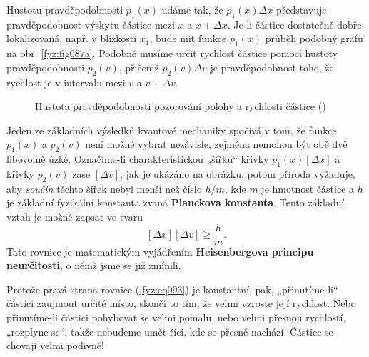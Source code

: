     Hustotu pravděpodobnosti \(p_1(x)\) udáme tak, že \(p_1(x)\Delta x\) představuje 
    pravděpodobnost výskytu částice mezi \(x\) a \(x+ \Delta x\). Je-li částice dostatečně dobře 
    lokalizovaná, např. v blízkosti \(x_1\), bude mít funkce \(p_1(x)\) průběh podobný grafu na 
    obr. \ref{fyz:fig087a}. Podobně musíme určit rychlost částice pomocí hustoty pravděpodobnosti 
    \(p_2(v)\), přičemž \(p_2(v)\Delta v\) je pravděpodobnost toho, že rychlost je v intervalu mezi 
    \(v\) a \(v+\Delta v\).
    
    \begin{figure}[ht!]  %
      \centering
                    \newline
      \caption{Hustota pravděpodobnosti pozorování polohy a rychlosti částice  
               (\cite[s.~89]{Feynman01})}
      \label{fyz:fig087}
    \end{figure}
    
    Jeden ze základních výsledků kvantové mechaniky spočívá v tom, že funkce \(p_1(x)\) a 
    \(p_2(v)\) není možné vybrat nezávisle, zejména nemohou být obě dvě libovolně úzké. Označíme-li 
    charakteristickou „šířku“ křivky \(p_1(x)[\Delta x]\) a křivky \(p_2(v)\) zase \([\Delta v]\), 
    jak je ukázáno na obrázku, potom příroda vyžaduje, aby \emph{součin} těchto šířek nebyl menší 
    než číslo \(h/m\), kde \(m\) je hmotnost částice a \(h\) je základní fyzikální konstanta zvaná 
    \textbf{Planckova konstanta}. Tento základní vztah je možné zapsat ve tvaru
    \begin{equation}\label{fyz:eq093}
      [\Delta x][\Delta v]\geq\frac{h}{m}.
    \end{equation}
    Tato rovnice je matematickým vyjádřením \textbf{Heisenbergova principu neurčitosti}, o němž 
    jsme se již zmínili.
    
    Protože pravá strana rovnice (\ref{fyz:eq093}) je konstantní, pak, „přinutíme-li“ částici 
    zaujmout určité místo, skončí to tím, že velmi vzroste její rychlost. Nebo přinutíme-li částici 
    pohybovat se velmi pomalu, nebo velmi přesnou rychlostí, „rozplyne se“, takže nebudeme umět 
    říci, kde se přesně nachází. Částice se chovají velmi podivně!
    
